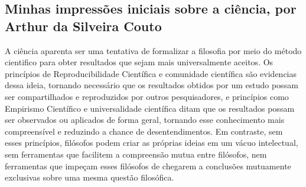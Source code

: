 \subsection{Minhas impressões iniciais sobre a ciência, por Arthur da Silveira Couto}

A ciência aparenta ser uma tentativa de formalizar a filosofia por meio do método cientifico para obter resultados que sejam mais universalmente aceitos. Os princípios de \gls{Reproducibilidade Científica} e comunidade científica são evidencias dessa ideia, tornando necessário que os resultados obtidos por um estudo possam ser compartilhados e reproduzidos por outros pesquisadores, e princípios como \gls{Empirismo Científico} e universalidade científica ditam que os resultados possam ser observados ou aplicados de forma geral, tornando esse conhecimento mais compreensível e reduzindo a chance de desentendimentos. Em contraste, sem esses princípios, filósofos podem criar as próprias ideias em um vácuo intelectual, sem ferramentas que facilitem a compreensão mutua entre filósofos, nem ferramentas que impeçam esses filósofos de chegarem a conclusões mutuamente exclusivas sobre uma mesma questão filosófica. 
